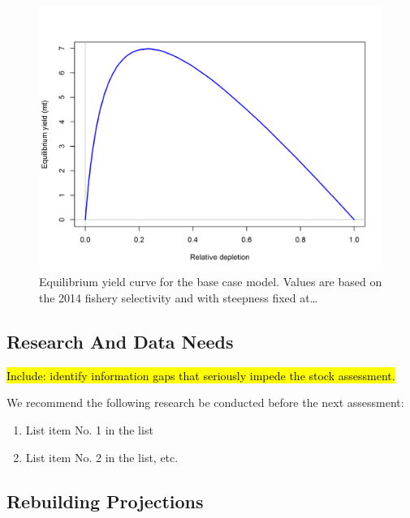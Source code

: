 \documentclass[12pt,]{article}
\begin{document}
\begin{figure}[htbp]
\centering
\includegraphics{r4ss/plots_mod1/yield1_yield_curve.png}
\caption{Equilibrium yield curve for the base case model. Values are
based on the 2014 fishery selectivity and with steepness fixed
at\ldots{} \label{fig:Yield_all}}
\end{figure}

\FloatBarrier

\newpage

\subsection*{Research And Data Needs}\label{research-and-data-needs}

\hl{Include: identify information gaps that seriously impede the stock assessment.}

We recommend the following research be conducted before the next
assessment:

\begin{enumerate}

\item List item No. 1 in the list

\item List item No. 2 in the list, etc.

\end{enumerate}

\subsection*{Rebuilding Projections}\label{rebuilding-projections}
\end{document}
